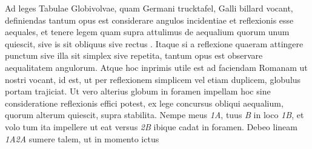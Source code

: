 \vspace{1.5em}
%
%
\pstart
 Ad leges Tabulae Globivolvae\protect{},  
%
quam Germani\protect{} trucktafel\protect{},  
%
Galli\protect{} billard\protect{} 
%
 vocant, definiendas tantum opus est considerare  
%
angulos incidentiae\protect{}  
%
et reflexionis\protect{}  
%
esse aequales, et tenere legem%
\protect{} quam supra attulimus de  
%
%
 aequalium%
\protect{} quorum unum quiescit, sive is sit obliquus%
\protect{} sive rectus%
\protect{}. Itaque si a reflexione  
%
quaeram attingere punctum sive illa sit simplex%
\protect{} sive repetita,%
\protect{}  
%
tantum opus est observare aequalitatem angulorum.  
%
Atque hoc inprimis utile est  
%
%
 ad faciendam Romanam ut nostri vocant, id  
%
est, ut per reflexionem simplicem%
\protect{} vel etiam duplicem,%
\protect{} globulus%
\protect{} portam trajiciat. 
Ut vero alterius globum%
\protect{} in foramen impellam hoc sine consideratione reflexionis%
\protect{} effici potest, ex lege  
%
concursus obliqui aequalium\protect{}\protect{}, quorum alterum quiescit, supra stabilita. Nempe meus  
%
%
 \textit{{\scriptsize1}A}, tuus \textit{B} in loco \textit{{\scriptsize1}B}, et volo tum ita impellere ut eat versus \textit{{\scriptsize2}B} 
%
 ibique cadat in foramen. Debeo lineam \textit{{\scriptsize1}A{\scriptsize2}A} sumere talem, ut in momento ictus\protect{} 
